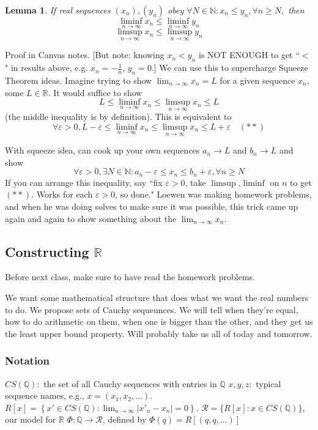 \documentclass{article}
\theoremstyle{plain}
\newtheorem{lemma}{Lemma}
\theoremstyle{remark}
\newcommand{\N}{{\mathbb N}}
\newcommand{\Q}{{\mathbb Q}}
\newcommand{\R}{{\mathbb R}}
\newcommand{\ep}{{\varepsilon}}
\begin{document}
\begin{lemma}
	If real sequences $(x_n),(y_n)$ obey
	$\forall N \in \N \colon x_n \leq y_n, \forall n \geq N,$
	then
	\[
		\liminf_{n\to\infty}x_n \leq \liminf_{n\to\infty}y_n
	\]
	\[
		\limsup_{n\to\infty}x_n \leq \limsup_{n\to\infty}y_n
	\]
\end{lemma}
Proof in Canvas notes.
[But note: knowing $x_n < y_n$ is NOT ENOUGH to get ``$<$" in results above,
e.g. $x_n = -\frac{1}{n}$, $y_n = 0$.]
We can use this to supercharge Squeeze Theorem ideas.
Imagine trying to show $\lim_{n\to\infty} x_n = L$
for a given sequence $x_n$, some $L \in \R$.
It would suffice to show
\[
	L \leq \liminf_{n\to\infty} x_n \leq \limsup_{n\to\infty}x_n \leq L
\]
(the middle inequality is by definition).
This is equivalent to
\[
	\forall \ep > 0, L-\ep \leq \liminf_{n\to\infty} x_n \leq \limsup_{n\to\infty}x_n \leq L + \ep\quad (**)
\]

With squeeze idea,
can cook up your own sequences $a_n \to L$ and $b_n \to L$ and show
\[
	\forall \ep > 0, \exists N \in \N \colon a_n -\ep \leq x_n \leq b_n + \ep, \forall n \geq N
\]
If you can arrange this inequality,
say ``fix $\ep > 0$,
take $\limsup$,$\liminf$ on $n$ to get $(**)$.
Works for each $\ep > 0$, so done."
Loewen was making homework problems,
and when he was doing solves to make sure it was possible,
this trick came up again and again to show something about the $\lim_{n\to\infty}x_n$.

\subsection{Constructing $\R$}
Before next class, make sure to have read the homework problems.

We want some mathematical structure that does what we want the real numbers to do.
We propose sets of Cauchy sequeunces.
We will tell when they're equal, how to do arithmetic on them,
when one is bigger than the other,
and they get us the least upper bound property.
Will probably take us all of today and tomorrow.

\subsubsection{Notation}
$CS(\Q)\colon$ the set of all Cauchy sequences with entries in $\Q$\newline
$x,y,z\colon$ typical sequence names, e.g., $x = (x_1,x_2,\dots)$.\newline
$R[x] = \left\{x' \in CS(\Q) \colon
\lim_{n\to\infty}\lvert x'_n - x_n \rvert = 0\right\}$.\newline
$\mathcal{R} = \{R[x] \colon x \in CS(\Q)\}$, our model for $\R$\newline
$\Phi \colon \Q \to \mathcal{R}$, defined by $\Phi(q) = R[(q,q,\dots)]$
\end{document}
